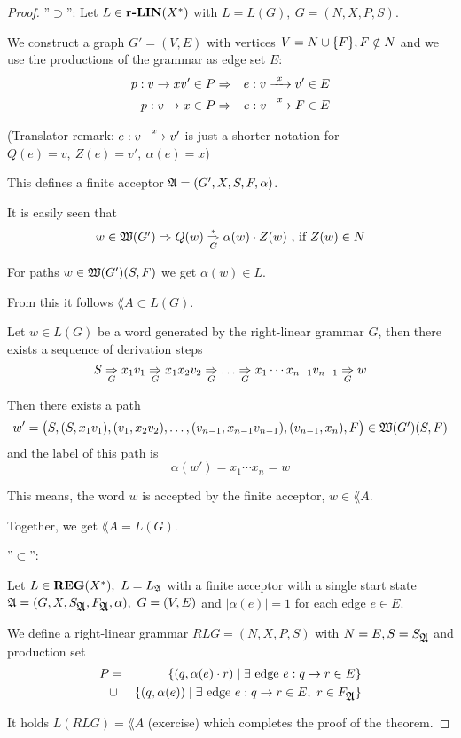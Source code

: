 \begin{proof}
''$\supset$'': Let $L \in \mbox{{\bf r-LIN}}(X^*)$ with $L = L(G),\ G = (N, X, P, S)$.

We construct a graph $G' = (V, E)$ with vertices $V = N \cup \mbox{$\{F\}$}, F
\notin N$ and we use the productions of the grammar as edge set $E$:
\begin{eqnarray*}
p: v \to x v' \in P & \Rightarrow & e:  v \xrightarrow{\ {x}\ } v' \in E \\
p: v \to x \in P & \Rightarrow & e : v \xrightarrow{\ {x}\ } F \in E
\end{eqnarray*} 

(Translator remark: $e: v \xrightarrow{\ {x}\ } v'$ is just a shorter notation for $Q(e) =
v, \ Z(e) = v',\ \alpha(e) = x$)

This defines a finite acceptor $\mbox{$\mathfrak{A}$} = (G', X, S, F, \alpha)$.

It is easily seen that
\[ w \in \mbox{$\mathfrak{W}({G'})$} \Rightarrow Q(w) \underset{{G}}{\overset{*}{\Rightarrow}} \alpha(w) \cdot Z(w) \text{
 , if } Z(w) \in N\]

For paths $w \in \mbox{$\mathfrak{W}({G'})$}(S, F)$ we get $\alpha(w) \in L$.

From this it follows $\lang{A} \subset L(G)$.

Let $w \in L(G)$ be a word generated by the right-linear grammar $G$, then there
exists a sequence of derivation steps
\[ S \underset{G}{\Rightarrow} x_1 v_1 \underset{G}{\Rightarrow} x_1 x_2 v_2 \underset{G}{\Rightarrow} \ldots
\underset{G}{\Rightarrow} x_1 \cdots x_{n-1} v_{n-1} \underset{G}{\Rightarrow} w \]

Then there exists a path 
\[ w' = \big(S, (S,x_1 v_1), (v_1, x_2 v_2), \ldots, (v_{n-1}, x_{n-1} v_{n-1}),
(v_{n-1}, x_n), F\big) \in \mbox{$\mathfrak{W}({G'})$}(S, F) \]
and the label of this path is
\[ \alpha(w') = x_1 \cdots x_n = w \]

This means, the word $w$ is accepted by the finite acceptor, $w \in \lang{A}$.

Together, we get $\lang{A} = L(G)$.

''$\subset$'':

Let $L \in \mbox{{\bf REG}}(X^*),\ L = \mbox{$L_{\mathfrak{A}}$}$ with a finite acceptor with a single start
state $\mbox{$\mathfrak{A}$} = (G, X, S_{\mbox{$\mathfrak{A}$}}, F_{\mbox{$\mathfrak{A}$}}, \alpha),\ G = (V, E)$ 
and $|\alpha(e)| = 1$ for each edge $e \in E$.

We define a right-linear grammar $RLG = (N, X, P, S)$ with $N = E, S =
S_{\mbox{$\mathfrak{A}$}}$ and production set
\begin{eqnarray*}
P & = & \mbox{$\{(q, \alpha(e) \cdot r) \mid \exists \text{ edge } e : q \to r \in
E\}$} \\
& \cup & \mbox{$\{(q, \alpha(e)) \mid \exists \text{ edge } e : q \to r \in E,\ r
\in F_{\mbox{$\mathfrak{A}$}}\}$}
\end{eqnarray*}

It holds $L(RLG) = \lang{A}$ (exercise) which completes the proof of the
theorem.
\end{proof}

